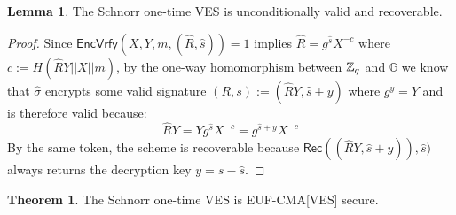 \documentclass[fullpage]{article}
\theoremstyle{definition}
\newtheorem{theorem}{Theorem}[section]
\newtheorem{lemma}{Lemma}[section]
\newcommand{\EUFCMAVES}{\textsf{EUF-CMA}[\textsf{VES}]\xspace}
\newcommand{\EncVer}{\textsf{EncVrfy}}
\newcommand{\Rec}{\textsf{Rec}}
\newcommand{\hatsigma}{\hat{\sigma}}
\newcommand{\G}{\mathbb{G}}
\begin{document}
\begin{lemma}
The Schnorr one-time VES is unconditionally valid and recoverable.
\end{lemma}

\begin{proof}
 Since $\EncVer(X,Y,m,(\hat{R},\hat{s})) = 1$ implies $ \hat{R} = g^{\hat{s}}X^{-c}$ where $c := H(\hat{R}Y || X || m)$, by the one-way homomorphism between $\mathbb{Z}_q$ and $\G$ we know that $\hatsigma$ encrypts some valid signature $(R,s) := (\hat{R}Y, \hat{s} + y)$ where $g^y = Y$ and is therefore valid because:
\[ \hat{R}Y = Yg^{\hat{s}}X^{-c} = g^{\hat{s} + y}X^{-c} \]
By the same token, the scheme is recoverable because $\Rec((\hat{R}Y, \hat{s} + y)), \hat{s})$ always returns the decryption key $y = s - \hat{s}$.
\end{proof}


\begin{theorem}
The Schnorr one-time VES is \EUFCMAVES secure.
\end{theorem}
\end{document}
